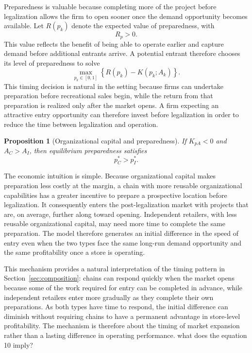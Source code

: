 \documentclass[english,12pt]{article}
\newtheorem{proposition}{Proposition}
\begin{document}
Preparedness is valuable because completing more of the project before legalization allows the firm to open sooner once the demand opportunity becomes available. Let $R(p_k)$ denote the expected value of preparedness, with
\[
R_p>0.
\]
This value reflects the benefit of being able to operate earlier and capture demand before additional entrants arrive. A potential entrant therefore chooses its level of preparedness to solve
\[
\max_{p_k\in[0,1]}
\left\{
R(p_k)-K(p_k;A_k)
\right\}.
\]
This timing decision is natural in the setting because firms can undertake preparation before recreational sales begin, while the return from that preparation is realized only after the market opens. A firm expecting an attractive entry opportunity can therefore invest before legalization in order to reduce the time between legalization and operation.

\begin{proposition}[Organizational capital and preparedness]
\label{prop:preparedness}
If $K_{pA}<0$ and $A_C>A_I$, then equilibrium preparedness satisfies
\[
p_C^*>p_I^*.
\]
\end{proposition}

The economic intuition is simple. Because organizational capital makes preparation less costly at the margin, a chain with more reusable organizational capabilities has a greater incentive to prepare a prospective location before legalization. It consequently enters the post-legalization market with projects that are, on average, further along toward opening. Independent retailers, with less reusable organizational capital, may need more time to complete the same preparation. The model therefore generates an initial difference in the speed of entry even when the two types face the same long-run demand opportunity and the same profitability once a store is operating.

This mechanism provides a natural interpretation of the timing pattern in Section~\ref{sec:composition}: chains can respond quickly when the market opens because some of the work required for entry can be completed in advance, while independent retailers enter more gradually as they complete their own preparations. As both types have time to respond, the initial difference can diminish without requiring chains to have a permanent advantage in store-level profitability. The mechanism is therefore about the timing of market expansion rather than a lasting difference in operating performance.
what does the equation 10 imply?
\end{document}

